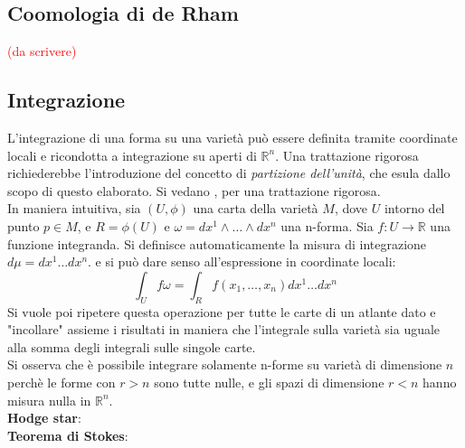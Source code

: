 \subsection{Coomologia di de Rham}
\textcolor{red}{(da scrivere)}
\subsection{Integrazione}
L'integrazione di una forma su una varietà può essere definita
tramite coordinate locali e ricondotta a integrazione su aperti di $\mathbb{R}^n$.
Una trattazione rigorosa richiederebbe l'introduzione del concetto di
\emph{partizione dell'unità}, che esula dallo scopo di questo elaborato.
Si vedano \cite{boothby},\cite{nakahara} per una trattazione rigorosa. \\
In maniera intuitiva, sia $(U,\phi)$ una carta della
varietà $M$, dove $U$ intorno del punto $p \in M$, e $R = \phi(U)$ e
$\omega = dx^1 \wedge \dots \wedge dx^n$ una n-forma.
Sia $f : U \to \mathbb{R}$ una funzione integranda.
Si definisce automaticamente la misura di integrazione $d\mu = dx^1 \dots dx^n$.
e si può dare senso all'espressione in coordinate locali:
$$
   \int_U f\omega = \int_R f(x_1,\dots,x_n) dx^1 \dots dx ^n
$$
Si vuole poi ripetere questa operazione per tutte le carte di un atlante dato e
"incollare" assieme i risultati in maniera che l'integrale sulla varietà sia uguale
alla somma degli integrali sulle singole carte.\\

Si osserva che è possibile integrare solamente n-forme su varietà di dimensione $n$
perchè le forme con $r>n$ sono tutte nulle, e gli spazi di dimensione $r<n$ hanno
misura nulla in $\mathbb{R}^n$.\\

\textbf{Hodge star}:\\
\textbf{Teorema di Stokes}:\\
